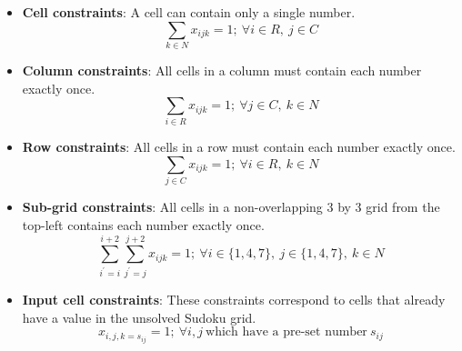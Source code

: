 \documentclass{article}
\begin{document}
\begin{itemize}
    \item \textbf{Cell constraints}: A cell can contain only a single number.
        \begin{equation*}
            \sum_{k \in N} x_{ijk} = 1 ; ~ \forall i \in R, ~ j \in C
        \end{equation*}
    \item \textbf{Column constraints}: All cells in a column must contain each number exactly once.
        \begin{equation*}
            \sum_{i \in R} x_{ijk} = 1 ; ~ \forall j \in C, ~ k \in N
        \end{equation*}
    \item \textbf{Row constraints}: All cells in a row must contain each number exactly once.
        \begin{equation*}
            \sum_{j \in C} x_{ijk} = 1 ; ~ \forall i \in R, ~ k \in N
        \end{equation*}
    \item \textbf{Sub-grid constraints}: All cells in a non-overlapping 3 by 3 grid from the top-left contains each number exactly once.
        \begin{equation*}
            \sum_{i^{\prime} = i}^{i + 2} \sum_{j^{\prime} = j}^{j + 2} x_{ijk} = 1 ; ~ \forall i \in \{1, 4, 7\}, ~ j \in \{1, 4, 7\}, ~ k \in N
        \end{equation*}
    \item \textbf{Input cell constraints}: These constraints correspond to cells that already have a value in the unsolved Sudoku grid.
        \begin{equation*}
            x_{i, j, k = s_{ij}} = 1; ~ \forall i, j ~ \text{which have a pre-set number} ~ s_{ij}
        \end{equation*}
\end{itemize}
\end{document}
